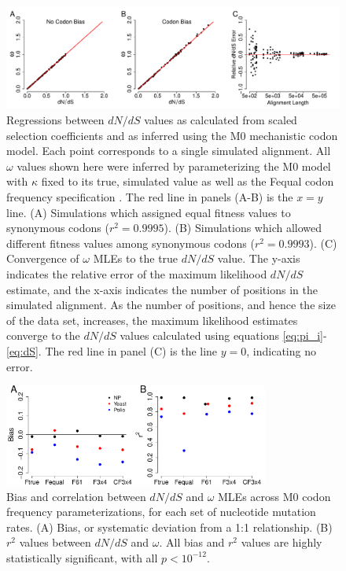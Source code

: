 \documentclass{pnastwo}
\begin{document}
\begin{figure}[htbp]
	\centerline{\includegraphics[width=18.7cm]{figures/MainText/regression_convergence.pdf}}
	\caption{\label{reg_conv} Regressions between $dN/dS$ values as calculated from scaled selection coefficients and as inferred using the M0 mechanistic codon model. Each point corresponds to a single simulated alignment. All $\omega$ values shown here were inferred by parameterizing the M0 model with $\kappa$ fixed to its true, simulated value as well as the Fequal codon frequency specification \cite{Yang2006}. The red line in panels (A-B) is the $x=y$ line. (A) Simulations which assigned equal fitness values to synonymous codons ($r^2=0.9995$). (B) Simulations which allowed different fitness values among synonymous codons ($r^2=0.9993$). (C) Convergence of $\omega$ MLEs to the true $dN/dS$ value. The y-axis indicates the relative error of the maximum likelihood $dN/dS$ estimate, and the x-axis indicates the number of positions in the simulated alignment. As the number of positions, and hence the size of the data set, increases, the maximum likelihood estimates converge to the $dN/dS$ values calculated using equations \eqref{eq:pi_i}-\eqref{eq:dS}. The red line in panel (C) is the line $y=0$, indicating no error.}
\end{figure}
	
\vspace{2cm}
	

\begin{figure}[htbp]
	\centerline{\includegraphics[width=8.7cm]{figures/MainText/nyp_bias_r2.pdf}}
	\caption{\label{nyp_bias_r2} Bias and correlation between $dN/dS$ and $\omega$ MLEs across M0 codon frequency parameterizations, for each set of nucleotide mutation rates. (A) Bias, or systematic deviation from a 1:1 relationship. (B) $r^2$ values between $dN/dS$ and $\omega$. All bias and $r^2$ values are highly statistically significant, with all $p < 10^{-12}$.}
\end{figure}
	
\end{document}
